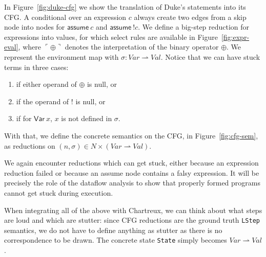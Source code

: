 \documentclass[runningheads]{llncs}
\newcommand{\Chartreux}{\textsf{Chartreux}}
\newcommand{\harpoon}{\rightharpoonup}
\newcommand{\Val}{\mathit{Val}}
\newcommand{\Var}{\mathit{Var}}
\newcommand{\kVar}{\mathsf{Var}}
\newcommand{\kassume}{\mathsf{assume}}
\newcommand{\sem}[1]{\ulcorner #1 \urcorner}
\newcommand{\lean}[1]{\lstinline[language=Lean]|#1|}
\begin{document}
In Figure~\ref{fig:duke-cfg} we show the translation of Duke's statements into its CFG. A conditional over an expression $c$ always create two edges from a skip node into nodes for $\kassume\ c$ and $\kassume\ {!}c$. We define a big-step reduction for expressions into values, for which select rules are available in Figure~\ref{fig:expr-eval}, where $\sem{\oplus}$ denotes the interpretation of the binary operator $\oplus$. We represent the environment map with $\sigma : \Var \harpoon \Val$. Notice that we can have stuck terms in three cases:
\begin{enumerate}
  \item if either operand of $\oplus$ is null, or
  \item if the operand of $!$ is null, or
  \item if for $\kVar\ x$, $x$ is not defined in $\sigma$.
\end{enumerate}

With that, we define the concrete semantics on the CFG, in Figure~\ref{fig:cfg-sem}, as reductions on $(n, \sigma) \in N \times (\Var \harpoon \Val)$.

We again encounter reductions which can get stuck, either because an expression reduction failed or because an assume node contains a falsy expression. It will be precisely the role of the dataflow analysis to show that properly formed programs cannot get stuck during execution.

When integrating all of the above with \Chartreux, we can think about what steps are loud and which are stutter: since CFG reductions are the ground truth \lean{LStep} semantics, we do not have to define anything as stutter as there is no correspondence to be drawn. The concrete state \lean{State} simply becomes $\Var \harpoon \Val$.
\end{document}
